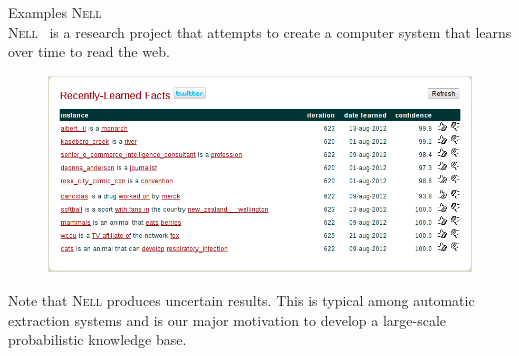 \documentclass[onlymath,xcolor=pdftex,dvipsnames,table]{beamer}
\newcommand{\nell}{\textsc{Nell}\xspace}
\newcommand{\head}[1]{{\large\color{OliveGreen}#1\\[5pt]}}
\begin{document}
\begin{frame}{Examples}
\head{\nell}
\nell~\cite{carlson2010toward} is a research project that attempts to create a computer system that learns over time to read the web.
\begin{figure}
  \centering
  \includegraphics[width=.6\textwidth]{nell.png}
\end{figure}
Note that \nell produces uncertain results. This is typical among automatic extraction systems and is our major motivation to develop a large-scale probabilistic knowledge base.
\end{frame}
\end{document}
